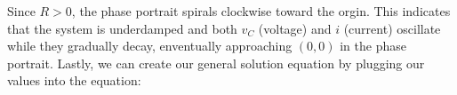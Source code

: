 \documentclass[preview]{standalone}
\begin{document}
\begin{center}
\raggedright
                    Since $R > 0$, the phase portrait spirals clockwise toward the orgin. This indicates
                    that the system is underdamped and both $v_C$ (voltage) and $i$ (current) oscillate 
                    while they gradually decay, enventually approaching $(0,0)$ in the phase portrait.
                    Lastly, we can create our general solution equation by plugging our values into the 
                    equation:
\end{center}
\end{document}
